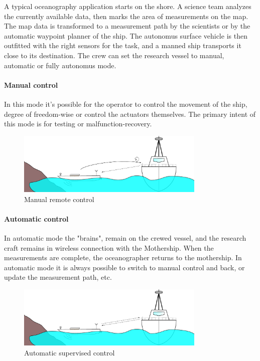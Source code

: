  A typical oceanography application starts on the shore. A science team analyzes the currently available data, then marks the area of measurements on the map. The  map data is transformed to a measurement path by the scientists or by the automatic waypoint planner of the ship. The autonomus surface vehicle is then outfitted with the right sensors for the task, and a manned ship transports it close to its destination. The crew can set the research vessel to manual, automatic or fully autonomus mode.

\paragraph{Manual control}
In this mode it's possible for the operator to control the movement of the ship, degree of freedom-wise or control the actuators themselves. The primary intent of this mode is for testing or malfunction-recovery.

\begin{figure}[H]
	\centering
	\includegraphics[width=0.8\textwidth]{img/manualcontrol}
	\caption{Manual remote control}
	\label{fig:manualcontrol}
\end{figure}

\paragraph{Automatic control}
In automatic mode the "brains", remain on the crewed vessel, and the research craft remains in wireless connection with the Mothership. When the measurements are complete, the oceanographer returns to the mothership. In automatic mode it is always possible to switch to manual control and back, or update the measurement path, etc.

\begin{figure}[H]
	\centering
	\includegraphics[width=0.8\textwidth]{img/automatic}
	\caption{Automatic supervised control}
	\label{fig:automatic}
\end{figure}

